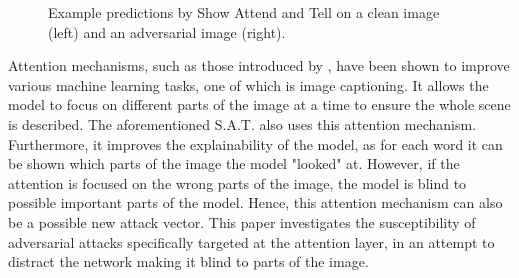 \begin{figure}[h]
    \centering
    \vspace{\floatsep}
    \caption{Example predictions by Show Attend and Tell on a clean image (left) and an adversarial image (right).}

\end{figure}

Attention mechanisms, such as those introduced by \citeauthor{attention_bahdanau}, have been shown to improve various machine learning tasks, one of which is image captioning. It allows the model to focus on different parts of the image at a time to ensure the whole scene is described. The aforementioned S.A.T. also uses this attention mechanism. Furthermore, it improves the explainability of the model, as for each word it can be shown which parts of the image the model "looked" at. However, if the attention is focused on the wrong parts of the image, the model is blind to possible important parts of the model. Hence, this attention mechanism can also be a possible new attack vector. This paper investigates the susceptibility of adversarial attacks specifically targeted at the attention layer, in an attempt to distract the network making it blind to parts of the image.


